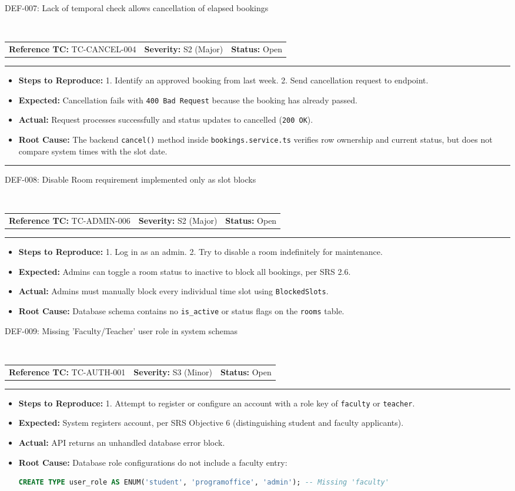 \documentclass[11pt,a4paper]{article}
\makeatletter
\newcommand{\defectheader}[5]{%
    \needspace{6\baselineskip}
    \noindent\colorbox{primaryblue}{\parbox{\dimexpr\textwidth-2\fboxsep\relax}{
        \color{white}\bfseries\large\strut #1: #2
    }}
    \nopagebreak\\
    \noindent\begin{tabularx}{\textwidth}{@{}X X X@{}}
        \textbf{Reference TC:} #3 & \textbf{Severity:} #4 & \textbf{Status:} #5 \\
    \end{tabularx}
    \nopagebreak\vspace{0.1cm}
    \nopagebreak\hrule\vspace{0.2cm}
}
\makeatother
\begin{document}
\defectheader{DEF-007}{Lack of temporal check allows cancellation of elapsed bookings}{TC-CANCEL-004}{S2 (Major)}{Open}
\begin{itemize}[noitemsep,topsep=1pt,leftmargin=0.5cm]
    \item \textbf{Steps to Reproduce:} 
    1. Identify an approved booking from last week. 2. Send cancellation request to endpoint.
    \item \textbf{Expected:} Cancellation fails with \texttt{400 Bad Request} because the booking has already passed.
    \item \textbf{Actual:} Request processes successfully and status updates to cancelled (\texttt{200 OK}).
    \item \textbf{Root Cause:} The backend \texttt{cancel()} method inside \texttt{bookings.service.ts} verifies row ownership and current status, but does not compare system times with the slot date.
\end{itemize}

\vspace{0.4cm}\hrule\vspace{0.4cm}

\defectheader{DEF-008}{Disable Room requirement implemented only as slot blocks}{TC-ADMIN-006}{S2 (Major)}{Open}
\begin{itemize}[noitemsep,topsep=1pt,leftmargin=0.5cm]
    \item \textbf{Steps to Reproduce:} 
    1. Log in as an admin. 2. Try to disable a room indefinitely for maintenance.
    \item \textbf{Expected:} Admins can toggle a room status to inactive to block all bookings, per SRS 2.6.
    \item \textbf{Actual:} Admins must manually block every individual time slot using \texttt{BlockedSlots}.
    \item \textbf{Root Cause:} Database schema contains no \texttt{is\_active} or status flags on the \texttt{rooms} table.
\end{itemize}

\newpage

\defectheader{DEF-009}{Missing 'Faculty/Teacher' user role in system schemas}{TC-AUTH-001}{S3 (Minor)}{Open}
\begin{itemize}[noitemsep,topsep=1pt,leftmargin=0.5cm]
    \item \textbf{Steps to Reproduce:} 
    1. Attempt to register or configure an account with a role key of \texttt{faculty} or \texttt{teacher}.
    \item \textbf{Expected:} System registers account, per SRS Objective 6 (distinguishing student and faculty applicants).
    \item \textbf{Actual:} API returns an unhandled database error block.
    \item \textbf{Root Cause:} Database role configurations do not include a faculty entry:
    \begin{lstlisting}[language=SQL]
    CREATE TYPE user_role AS ENUM('student', 'programoffice', 'admin'); -- Missing 'faculty'
    \end{lstlisting}
\end{itemize}
\end{document}
